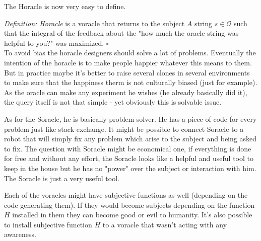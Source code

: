 \documentclass{article}
\begin{document}
The Horacle is now very easy to define. 

\textit{Definition: Horacle} is a voracle that returns to the subject $A$ string  $s \in \mathcal{O}$ such that the integral of the feedback about the "how much the oracle string was helpful to you?" was maximized. $\square$ \\

To avoid bias the horacle designers should solve a lot of problems. Eventually the intention of the horacle is to make people happier whatever this means to them. But in practice maybe it's better to raise several clones in several environments to make sure that the happiness therm is not culturally biased (just for example). As the oracle can make any experiment he wishes (he already basically did it), the query itself is not that simple - yet obviously this is solvable issue. 

As for the Soracle, he is basically problem solver. He has a piece of code for every problem just like stack exchange. It might be possible to connect Soracle to a robot that will simply fix any problem which arise to the subject and being asked to fix. The question with Soracle might be economical one, if everything is done for free and without any effort, the Soracle looks like a helpful and useful tool to keep in the house but he has no "power" over the subject or interaction with him. The Soracle is just a very useful tool. 

Each of the voracles might have subjective functions as well (depending on the code generating them). If they would become subjects depending on the function $H$ installed in them they can become good or evil to humanity. It's also possible to install subjective function $H$ to a voracle that wasn't acting with any awareness. 
\end{document}
